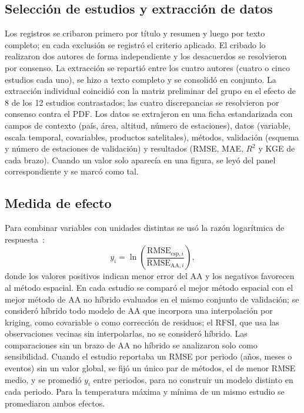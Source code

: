 \documentclass[conference]{IEEEtran}
\begin{document}
\subsection{Selección de estudios y extracción de datos}
Los registros se cribaron primero por título y resumen y luego por texto completo; en cada exclusión se registró el criterio aplicado. El cribado lo realizaron dos autores de forma independiente y los desacuerdos se resolvieron por consenso. La extracción se repartió entre los cuatro autores (cuatro o cinco estudios cada uno), se hizo a texto completo y se consolidó en conjunto. La extracción individual coincidió con la matriz preliminar del grupo en el efecto de 8 de los 12 estudios contrastados; las cuatro discrepancias se resolvieron por consenso contra el PDF. Los datos se extrajeron en una ficha estandarizada con campos de contexto (país, área, altitud, número de estaciones), datos (variable, escala temporal, covariables, productos satelitales), métodos, validación (esquema y número de estaciones de validación) y resultados (RMSE, MAE, $R^2$ y KGE de cada brazo). Cuando un valor solo aparecía en una figura, se leyó del panel correspondiente y se marcó como tal.

\subsection{Medida de efecto}
Para combinar variables con unidades distintas se usó la razón logarítmica de respuesta~\cite{hedges1999}:
\begin{equation}
y_i = \ln\!\left(\frac{\mathrm{RMSE}_{\mathrm{esp},i}}{\mathrm{RMSE}_{\mathrm{AA},i}}\right),
\label{eq:efecto}
\end{equation}
donde los valores positivos indican menor error del AA y los negativos favorecen al método espacial. En cada estudio se comparó el mejor método espacial con el mejor método de AA no híbrido evaluados en el mismo conjunto de validación; se consideró híbrido todo modelo de AA que incorpora una interpolación por kriging, como covariable o como corrección de residuos; el RFSI, que usa las observaciones vecinas sin interpolarlas, no se consideró híbrido. Las comparaciones sin un brazo de AA no híbrido se analizaron solo como sensibilidad. Cuando el estudio reportaba un RMSE por periodo (años, meses o eventos) sin un valor global, se fijó un único par de métodos, el de menor RMSE medio, y se promedió $y_i$ entre periodos, para no construir un modelo distinto en cada periodo. Para la temperatura máxima y mínima de un mismo estudio se promediaron ambos efectos.
\end{document}
